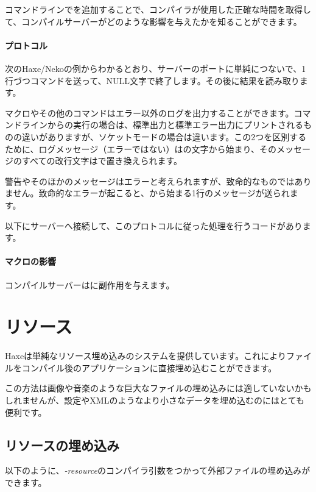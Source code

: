 コマンドラインでを追加することで、コンパイラが使用した正確な時間を取得して、コンパイルサーバーがどのような影響を与えたかを知ることができます。

\paragraph{プロトコル}
次のHaxe/Nekoの例からわかるとおり、サーバーのポートに単純につないで、1行づつコマンドを送って、NULL文字で終了します。その後に結果を読み取ります。

マクロやその他のコマンドはエラー以外のログを出力することができます。コマンドラインからの実行の場合は、標準出力と標準エラー出力にプリントされるものの違いがありますが、ソケットモードの場合は違います。この2つを区別するために、ログメッセージ（エラーではない）はの文字から始まり、そのメッセージのすべての改行文字はで置き換えられます。

警告やそのほかのメッセージはエラーと考えられますが、致命的なものではありません。致命的なエラーが起こると、から始まる1行のメッセージが送られます。

以下にサーバーへ接続して、このプロトコルに従った処理を行うコードがあります。


\paragraph{マクロの影響}

コンパイルサーバーはに副作用を与えます。

\section{リソース}
\label{cr-resources}

Haxeは単純なリソース埋め込みのシステムを提供しています。これによりファイルをコンパイル後のアプリケーションに直接埋め込むことができます。

この方法は画像や音楽のような巨大なファイルの埋め込みには適していないかもしれませんが、設定やXMLのようなより小さなデータを埋め込むのにはとても便利です。

\subsection{リソースの埋め込み}
\label{cr-resources-embed}

以下のように、\emph{-resource}のコンパイラ引数をつかって外部ファイルの埋め込みができます。

